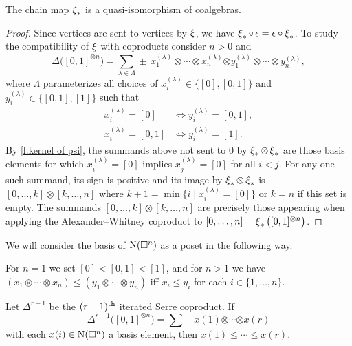 \begin{lemma}
	The chain map $\operatorname{\xi}_\ast$ is a quasi-isomorphism of coalgebras.
\end{lemma}

\begin{proof}
	Since vertices are sent to vertices by $\operatorname{\xi}$, we have $\operatorname{\xi}_\ast \circ \, \epsilon = \epsilon \circ \operatorname{\xi}_\ast$.
	To study the compatibility of $\operatorname{\xi}$ with coproducts consider $n > 0$ and
	\[
	\Delta \big( [0,1]^{\otimes n} \big) = \sum_{\lambda \in \Lambda} \pm \ x_1^{(\lambda)} \otimes \cdots \otimes x_n^{(\lambda)} \bm{\otimes} y_1^{(\lambda)} \otimes \cdots \otimes y_n^{(\lambda)},
	\]
	where $\Lambda$ parameterizes all choices of $x_i^{(\lambda)} \in \{[0], [0,1]\}$ and $y_i^{(\lambda)} \in \{[0,1], [1]\}$ such that
	\begin{align*}
	x_i^{(\lambda)} = [0]   & \iff y_i^{(\lambda)} = [0,1], \\
	x_i^{(\lambda)} = [0,1] & \iff y_i^{(\lambda)} = [1].
	\end{align*}
	By \cref{l:kernel of psi}, the summands above not sent to $0$ by $\operatorname{\xi}_\ast \otimes \operatorname{\xi}_\ast$ are those basis elements for which $x_i^{(\lambda)} = [0]$ implies $x_j^{(\lambda)} = [0]$ for all $i < j$.
	For any one such summand, its sign is positive and its image by $\operatorname{\xi}_\ast \otimes \operatorname{\xi}_\ast$ is $[0, \dots, k] \otimes [k, \dots, n]$ where $k+1 = \min \{i \mid x_i^{(\lambda)} = [0]\}$ or $k = n$ if this set is empty.
	The summands $[0, \dots, k] \otimes [k, \dots, n]$ are precisely those appearing when applying the Alexander--Whitney coproduct to $[0, \dots, n] = \operatorname{\xi}_\ast \big( [0,1]^{\otimes n} \big)$.
\end{proof}

We will consider the basis of $\operatorname{N}(\square^n)$ as a poset in the following way.

\begin{definition}
	For $n = 1$ we set $[0] < [0,1] < [1]$, and for $n > 1$ we have $(x_1 \otimes \cdots \otimes x_n) \leq (y_1 \otimes \cdots \otimes y_n)$ iff $x_i \leq y_i$ for each $i \in \{1, \dots, n\}$.
\end{definition}

\begin{lemma}
	Let $\Delta^{r-1}$ be the $(r-1)^{\mathrm{th}}$ iterated Serre coproduct.
	If
	\[
	\Delta^{r-1} \big([0,1]^{\otimes n}\big) =
	\sum \pm \ x{(1)} \bm{\otimes} \cdots \bm{\otimes} x{(r)}
	\]
	with each $x(i) \in \operatorname{N}(\square^n)$ a basis element, then $x{(1)} \leq \cdots \leq x{(r)}$.
\end{lemma}

